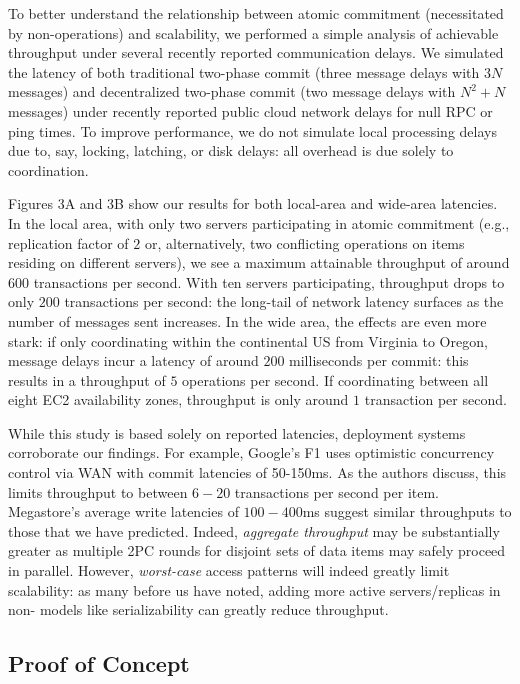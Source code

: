 To better understand the relationship between atomic commitment
(necessitated by non-\iconfluent operations) and scalability, we
performed a simple analysis of achievable throughput under several
recently reported communication delays. We simulated the latency of
both traditional two-phase commit (three message delays with $3N$
messages) and decentralized two-phase commit (two message delays with
$N^2+N$ messages) under recently reported public cloud network delays
for null RPC or ping times. To improve performance, we do not simulate
local processing delays due to, say, locking, latching, or disk
delays: all overhead is due solely to coordination.

Figures 3A and 3B show our results for both local-area and wide-area
latencies.  In the local area, with only two servers participating in
atomic commitment (e.g., replication factor of $2$ or, alternatively,
two conflicting operations on items residing on different servers), we
see a maximum attainable throughput of around $600$ transactions per
second. With ten servers participating, throughput drops to only $200$
transactions per second: the long-tail of network latency surfaces as
the number of messages sent increases. In the wide area, the effects
are even more stark: if only coordinating within the continental US
from Virginia to Oregon, message delays incur a latency of around
$200$ milliseconds per commit: this results in a throughput of $5$
operations per second. If coordinating between all eight EC2
availability zones, throughput is only around $1$ transaction per
second.

While this study is based solely on reported latencies, deployment
systems corroborate our findings. For example, Google's F1 uses
optimistic concurrency control via WAN with commit latencies of
50-150ms. As the authors discuss, this limits throughput to between
$6-20$ transactions per second per item. Megastore's average write
latencies of $100-400$ms suggest similar throughputs to those that we
have predicted. Indeed, \textit{aggregate throughput} may be
substantially greater as multiple 2PC rounds for disjoint sets of data
items may safely proceed in parallel. However, \textit{worst-case}
access patterns will indeed greatly limit scalability: as many before
us have noted, adding more active servers/replicas in non-\cfree
models like serializability can greatly reduce throughput.

\subsection{Proof of Concept}

